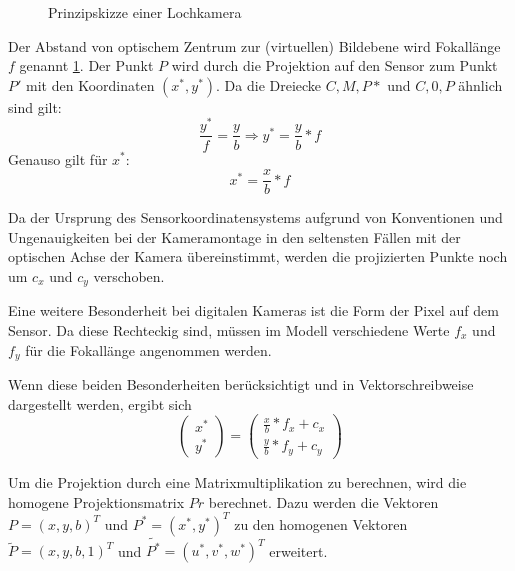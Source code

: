 \begin{figure}[htpb]
  \centering
  \def\svgwidth{\textwidth}
  
  \caption{Prinzipskizze einer Lochkamera }
  \label{fig:Lochkamera}
\end{figure}


Der Abstand von optischem Zentrum zur (virtuellen) Bildebene wird Fokallänge
$f$ genannt \ref{fig:Lochkamera}. Der Punkt $P$ wird durch die Projektion auf
den Sensor zum Punkt $P'$ mit den Koordinaten $(x^*,y^*)$. Da die Dreiecke
$C,M,P*$ und $C,0,P$ ähnlich sind gilt: \begin{equation}
  \frac{y^*}{f}=\frac{y}{b} \Rightarrow y^*=\frac{y}{b}*f \end{equation}
Genauso gilt für $x^*$: \begin{equation} x^*=\frac{x}{b}*f \end{equation}

Da der Ursprung des Sensorkoordinatensystems aufgrund von Konventionen und
Ungenauigkeiten bei der Kameramontage in den seltensten Fällen mit der
optischen Achse der Kamera übereinstimmt, werden die projizierten Punkte noch um
$c_x$ und $c_y$ verschoben.

Eine weitere Besonderheit bei digitalen Kameras ist die Form der Pixel auf dem
Sensor. Da diese Rechteckig sind, müssen im Modell verschiedene Werte $f_x$ und
$f_y$ für die Fokallänge angenommen werden.\cite{Bradski2008}

Wenn diese beiden Besonderheiten berücksichtigt und in
Vektorschreibweise dargestellt werden, ergibt sich \begin{equation}
  \begin{pmatrix} x^*\\y^* \end{pmatrix} = \begin{pmatrix} \frac{x}{b}*f_x+c_x
    \\ \frac{y}{b}*f_y+c_y \end{pmatrix} \end{equation}


Um die Projektion durch eine Matrixmultiplikation zu berechnen, wird die
homogene Projektionsmatrix $Pr$ berechnet. Dazu werden die Vektoren
$P=\left(x,y,b\right)^T$ und $P^*=\left(x^*,y^*\right)^T$ zu den homogenen
Vektoren $\tilde{P}=\left(x,y,b,1\right)^T$ und
$\tilde{P^*}=\left(u^*,v^*,w^*\right)^T$ erweitert.

